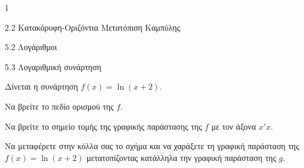 \begin{ylh}{1}
\item 2.2 Κατακόρυφη-Οριζόντια Μετατόπιση Καμπύλης
\item 5.2 Λογάριθμοι
\item 5.3 Λογαριθμική συνάρτηση
\end{ylh}
Δίνεται η συνάρτηση $f(x) = \ln(x + 2)$.
\begin{alist}
\item Να βρείτε το πεδίο ορισμού της $f$. 
\item Να βρείτε το σημείο τομής της γραφικής παράστασης της $f$ με τον άξονα $x'x$. 
\begin{center}
\end{center}
\item Να μεταφέρετε στην κόλλα σας το σχήμα και να χαράξετε τη γραφική παράσταση της $f(x) = \ln(x + 2)$ μετατοπίζοντας κατάλληλα την γραφική παράσταση της $g$. 
\end{alist}

